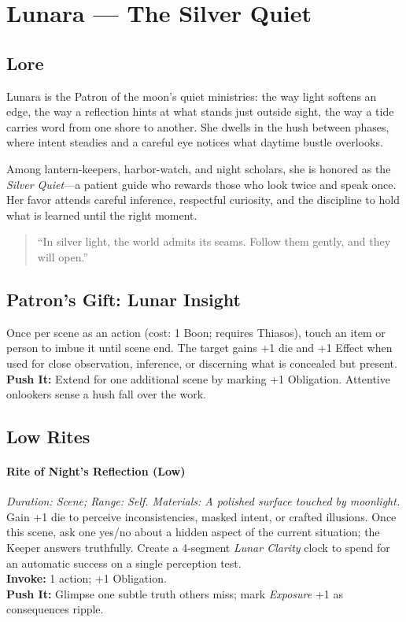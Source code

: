 \section{Lunara — The Silver Quiet}
\label{patron:lunara}

\subsection*{Lore}
%
Lunara is the Patron of the moon’s quiet ministries: the way light softens an edge, the way a reflection hints at what stands just outside sight, the way a tide carries word from one shore to another. She dwells in the hush between phases, where intent steadies and a careful eye notices what daytime bustle overlooks. 

Among lantern-keepers, harbor-watch, and night scholars, she is honored as the \emph{Silver Quiet}—a patient guide who rewards those who look twice and speak once. Her favor attends careful inference, respectful curiosity, and the discipline to hold what is learned until the right moment.

\begin{quote}
``In silver light, the world admits its seams. Follow them gently, and they will open.''
\end{quote}

\subsection*{Patron's Gift: Lunar Insight}
Once per scene as an action (cost: 1 Boon; requires Thiasos), touch an item or person to imbue it until scene end. The target gains +1 die and +1 Effect when used for close observation, inference, or discerning what is concealed but present.\\
\textbf{Push It:} Extend for one additional scene by marking +1 Obligation. Attentive onlookers sense a hush fall over the work.

\subsection*{Low Rites}

\paragraph{Rite of Night's Reflection (Low)}%
\emph{Duration: Scene; Range: Self. Materials: A polished surface touched by moonlight.}\\
Gain +1 die to perceive inconsistencies, masked intent, or crafted illusions. Once this scene, ask one yes/no about a hidden aspect of the current situation; the Keeper answers truthfully. Create a 4-segment \emph{Lunar Clarity} clock to spend for an automatic success on a single perception test.\\
\textbf{Invoke:} 1 action; +1 Obligation.\\
\textbf{Push It:} Glimpse one subtle truth others miss; mark \emph{Exposure} +1 as consequences ripple.

